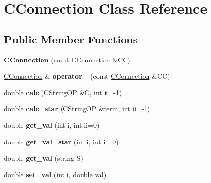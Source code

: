 \hypertarget{class_c_connection}{}\section{C\+Connection Class Reference}
\label{class_c_connection}
\subsection*{Public Member Functions}
\begin{DoxyCompactItemize}
\item 
\mbox{\label{class_c_connection_a66fc73ea5215ad1f6b443d729557391f}} 
{\bfseries C\+Connection} (const \hyperlink{class_c_connection}{C\+Connection} \&CC)
\item 
\mbox{\label{class_c_connection_a34b79e330c83e379983d77dcd55eade8}} 
\hyperlink{class_c_connection}{C\+Connection} \& {\bfseries operator=} (const \hyperlink{class_c_connection}{C\+Connection} \&CC)
\item 
\mbox{\label{class_c_connection_a89dc65968185f1d6c677878d7808cf07}} 
double {\bfseries calc} (\hyperlink{class_c_string_o_p}{C\+String\+OP} \&C, int ii=-\/1)
\item 
\mbox{\label{class_c_connection_aadd32db377fc6d3077abe1e6d7d17170}} 
double {\bfseries calc\+\_\+star} (\hyperlink{class_c_string_o_p}{C\+String\+OP} \&term, int ii=-\/1)
\item 
\mbox{\label{class_c_connection_a3121c0bb347b87db07597977df2c9448}} 
double {\bfseries get\+\_\+val} (int i, int ii=0)
\item 
\mbox{\label{class_c_connection_a8fff18585670d132af98124597a09778}} 
double {\bfseries get\+\_\+val\+\_\+star} (int i, int ii=0)
\item 
\mbox{\label{class_c_connection_af7b665b5919aa6c0cefc508575357802}} 
double {\bfseries get\+\_\+val} (string S)
\item 
\mbox{\label{class_c_connection_a8dd0f9eb07266c89ccee5fad8da4f08f}} 
double {\bfseries set\+\_\+val} (int i, double val)

\end{DoxyCompactItemize}
